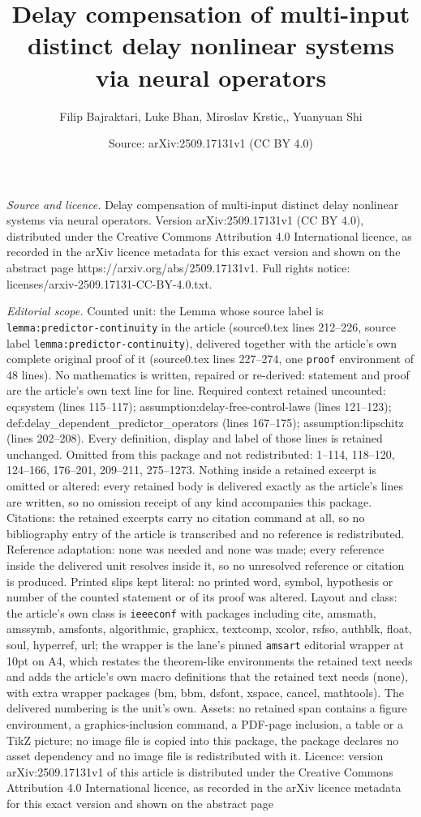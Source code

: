 \documentclass[10pt,a4paper]{amsart}
\title[Delay compensation of multi-input distinct delay nonlinear s]{Delay compensation of multi-input distinct delay nonlinear systems via neural operators}
\author{Filip Bajraktari, Luke Bhan, Miroslav Krstic,, Yuanyuan Shi}
\date{Source: arXiv:2509.17131v1 (CC BY 4.0)}
\begin{document}
\maketitle

\noindent\emph{Source and licence.} Delay compensation of multi-input distinct delay nonlinear systems via neural operators. Version arXiv:2509.17131v1 (CC BY 4.0), distributed under the Creative Commons Attribution 4.0 International licence, as recorded in the arXiv licence metadata for this exact version and shown on the abstract page https://arxiv.org/abs/2509.17131v1. Full rights notice: licenses/arxiv-2509.17131-CC-BY-4.0.txt.\par\smallskip

\noindent\textit{Editorial scope.} Counted unit: the Lemma whose source label is \texttt{lemma:predictor-continuity} in the article (source0.tex lines 212--226, source label \texttt{lemma:predictor-continuity}), delivered together with the article's own complete original proof of it (source0.tex lines 227--274, one \texttt{proof} environment of 48 lines). No mathematics is written, repaired or re-derived: statement and proof are the article's own text line for line. Required context retained uncounted: eq:system (lines 115--117); assumption:delay-free-control-laws (lines 121--123); def:delay\_dependent\_predictor\_operators (lines 167--175); assumption:lipschitz (lines 202--208). Every definition, display and label of those lines is retained unchanged. Omitted from this package and not redistributed: 1--114, 118--120, 124--166, 176--201, 209--211, 275--1273. Nothing inside a retained excerpt is omitted or altered: every retained body is delivered exactly as the article's lines are written, so no omission receipt of any kind accompanies this package. Citations: the retained excerpts carry no citation command at all, so no bibliography entry of the article is transcribed and no reference is redistributed. Reference adaptation: none was needed and none was made; every reference inside the delivered unit resolves inside it, so no unresolved reference or citation is produced. Printed slips kept literal: no printed word, symbol, hypothesis or number of the counted statement or of its proof was altered. Layout and class: the article's own class is \texttt{ieeeconf} with packages including cite, amsmath, amssymb, amsfonts, algorithmic, graphicx, textcomp, xcolor, rsfso, authblk, float, soul, hyperref, url; the wrapper is the lane's pinned \texttt{amsart} editorial wrapper at 10pt on A4, which restates the theorem-like environments the retained text needs and adds the article's own macro definitions that the retained text needs (none), with extra wrapper packages (bm, bbm, dsfont, xspace, cancel, mathtools). The delivered numbering is the unit's own. Assets: no retained span contains a figure environment, a graphics-inclusion command, a PDF-page inclusion, a table or a TikZ picture; no image file is copied into this package, the package declares no asset dependency and no image file is redistributed with it. Licence: version arXiv:2509.17131v1 of this article is distributed under the Creative Commons Attribution 4.0 International licence, as recorded in the arXiv licence metadata for this exact version and shown on the abstract page 
\end{document}

